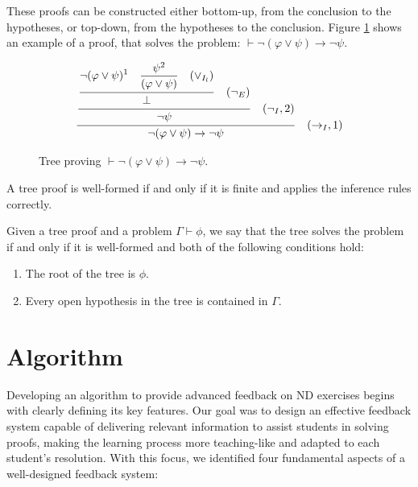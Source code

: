 \documentclass[runningheads]{llncs}
\begin{document}
\vspace{-2em}
These proofs can be constructed either bottom-up, from the conclusion to the hypotheses, or top-down, from the hypotheses to the conclusion. Figure \ref{tab:proof-tree} shows an example of a proof, that solves the problem: \( \vdash \neg (\varphi \lor \psi) \to \neg \psi \).
\vspace{-2em}
\begin{figure}[h!]
    \centering
    \[
    \frac{\displaystyle \frac{\displaystyle \frac{
    \displaystyle \neg (\varphi \lor \psi)^1 \quad \displaystyle \frac{\psi^2}{(\varphi \lor \psi) \strut} \quad (\lor_{I_l}) \strut}
    {\displaystyle \bot \strut} \quad (\displaystyle \neg_E)\strut} {\displaystyle \neg \psi \strut} \quad (\neg_I, 2) \strut}
    {\neg (\varphi \lor \psi) \to \neg \psi \strut} \quad (\to_I, 1)
    \]
    \caption{Tree proving \( \vdash \neg (\varphi \lor \psi) \to \neg \psi \).}
    \label{tab:proof-tree}
\end{figure}
\vspace{-2em}

\begin{definition}
A tree proof is well-formed if and only if it is finite and applies the inference rules correctly.
\end{definition}

\begin{definition}
Given a tree proof and a problem \(\Gamma \vdash \phi\), we say that the tree solves the problem if and only if it is well-formed and both of the following conditions hold:
\begin{enumerate}
    \item The root of the tree is \(\phi\).
    \item Every open hypothesis in the tree is contained in \(\Gamma\).
\end{enumerate}
\end{definition}

\section{Algorithm}
Developing an algorithm to provide advanced feedback on ND exercises begins with clearly defining its key features. Our goal was to design an effective feedback system capable of delivering relevant information to assist students in solving proofs, making the learning process more teaching-like and adapted to each student’s resolution. With this focus, we identified four fundamental aspects of a well-designed feedback system:
\end{document}
